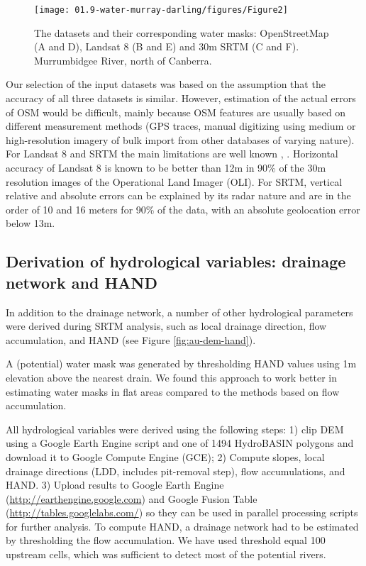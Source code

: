 \begin{figure}
	\centering
	\texttt{[image: 01.9-water-murray-darling/figures/Figure2]}
	\caption{The datasets and their corresponding water masks: OpenStreetMap (A and D), Landsat 8 (B and E) and 30m SRTM (C and F). Murrumbidgee River, north of Canberra.}
	\label{fig:au-datasets}
\end{figure}

Our selection of the input datasets was based on the assumption that the accuracy of all three datasets is similar. However, estimation of the actual errors of OSM would be difficult, mainly because OSM features are usually based on different measurement methods (GPS traces, manual digitizing using medium or high-resolution imagery of bulk import from other databases of varying nature). For Landsat 8 and SRTM the main limitations are well known \citep{Roy2014}, \citep{Rodriguez2006}. Horizontal accuracy of Landsat 8 is known to be better than 12m in 90\% of the 30m resolution images of the Operational Land Imager (OLI). For SRTM, vertical relative and absolute errors can be explained by its radar nature and are in the order of 10 and 16 meters for 90\% of the data, with an absolute geolocation error below 13m. 

\subsection{Derivation of hydrological variables: drainage network and HAND}
In addition to the drainage network, a number of other hydrological parameters were derived during SRTM analysis, such as local drainage direction, flow accumulation, and HAND (see Figure \ref{fig:au-dem-hand}). 

A (potential) water mask was generated by thresholding HAND values using 1m elevation above the nearest drain. We found this approach to work better in estimating water masks in flat areas compared to the methods based on flow accumulation.

All hydrological variables were derived using the following steps: 1) clip DEM using a Google Earth Engine script and one of 1494 HydroBASIN polygons and download it to Google Compute Engine (GCE); 2) Compute slopes, local drainage directions (LDD, includes pit-removal step), flow accumulations, and HAND. 3) Upload results to Google Earth Engine (\url{http://earthengine.google.com}) and Google Fusion Table (\url{http://tables.googlelabs.com/}) so they can be used in parallel processing scripts for further analysis. To compute HAND, a drainage network had to be estimated by thresholding the flow accumulation. We have used threshold equal 100 upstream cells, which was sufficient to detect most of the potential rivers. 


